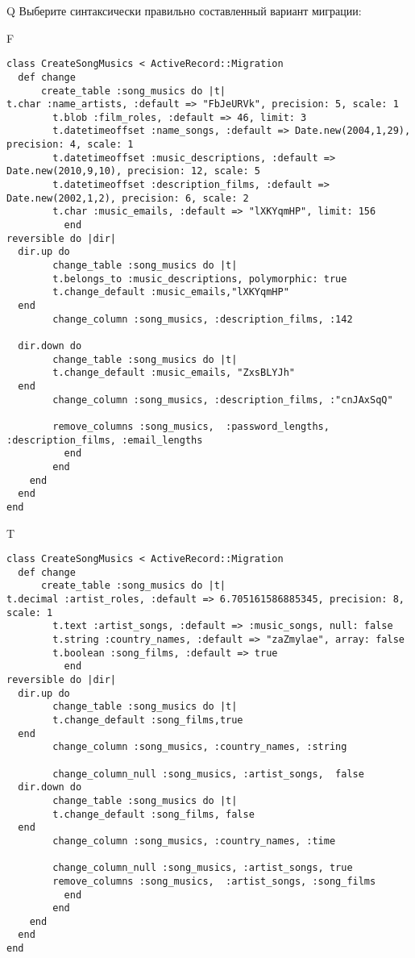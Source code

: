 Q
Выберите синтаксически правильно составленный вариант миграции:

F
\begin{verbatim}
class CreateSongMusics < ActiveRecord::Migration
  def change
	  create_table :song_musics do |t|
t.char :name_artists, :default => "FbJeURVk", precision: 5, scale: 1
		t.blob :film_roles, :default => 46, limit: 3
		t.datetimeoffset :name_songs, :default => Date.new(2004,1,29), precision: 4, scale: 1
		t.datetimeoffset :music_descriptions, :default => Date.new(2010,9,10), precision: 12, scale: 5
		t.datetimeoffset :description_films, :default => Date.new(2002,1,2), precision: 6, scale: 2
		t.char :music_emails, :default => "lXKYqmHP", limit: 156
		  end
reversible do |dir|
  dir.up do
		change_table :song_musics do |t|
		t.belongs_to :music_descriptions, polymorphic: true
 		t.change_default :music_emails,"lXKYqmHP"
  end
 		change_column :song_musics, :description_films, :142
   
  dir.down do
		change_table :song_musics do |t|
		t.change_default :music_emails, "ZxsBLYJh"
  end
 		change_column :song_musics, :description_films, :"cnJAxSqQ"
   
		remove_columns :song_musics,  :password_lengths, :description_films, :email_lengths 
	      end
	    end
    end 
  end
end

\end{verbatim}

T
\begin{verbatim}
class CreateSongMusics < ActiveRecord::Migration
  def change
	  create_table :song_musics do |t|
t.decimal :artist_roles, :default => 6.705161586885345, precision: 8, scale: 1
		t.text :artist_songs, :default => :music_songs, null: false
		t.string :country_names, :default => "zaZmylae", array: false
		t.boolean :song_films, :default => true
		  end
reversible do |dir|
  dir.up do
		change_table :song_musics do |t|
		t.change_default :song_films,true
  end
 		change_column :song_musics, :country_names, :string
   
		change_column_null :song_musics, :artist_songs,  false
  dir.down do
		change_table :song_musics do |t|
		t.change_default :song_films, false
  end
 		change_column :song_musics, :country_names, :time
   
		change_column_null :song_musics, :artist_songs, true
 		remove_columns :song_musics,  :artist_songs, :song_films 
	      end
	    end
    end 
  end
end

\end{verbatim}

